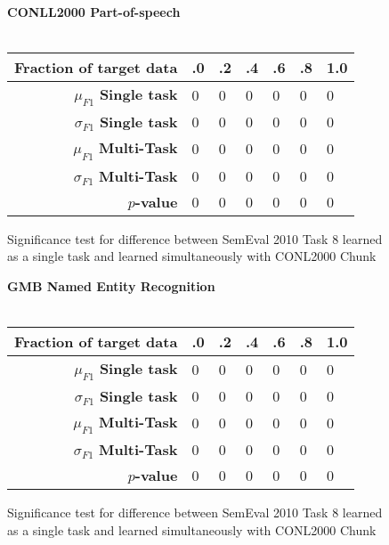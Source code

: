 \newpage
\vspace*{5.2cm}
\begin{figure}[h]
	\hspace*{-3cm}\textbf{CONLL2000 Part-of-speech}
	\\\\
	\centering
	\begin{tabular}{r | l | l | l | l | l | l}
		\textbf{Fraction of target data} & .0 & .2 & .4 & .6 & .8 & 1.0 \\  \hline
		$\mu_{F1}$ \textbf{Single task} & 0 & 0 & 0 & 0 & 0 & 0\\
		$\sigma_{F1}$ \textbf{Single task} & 0 & 0 & 0 & 0 & 0 & 0\\
		$\mu_{F1}$ \textbf{Multi-Task} & 0 & 0 & 0 & 0 & 0 & 0\\
		$\sigma_{F1}$ \textbf{Multi-Task} & 0 & 0 & 0 & 0 & 0 & 0\\
		$p$\textbf{-value} & 0 & 0 & 0 & 0 & 0 & 0
	\end{tabular}
	\caption{Significance test for difference between SemEval 2010 Task 8 learned as a single task and learned simultaneously with CONL2000 Chunk}
\end{figure}
\begin{figure}[h]
	\hspace*{-3cm}\textbf{GMB Named Entity Recognition}
	\\\\
	\centering
	\begin{tabular}{r | l | l | l | l | l | l}
		\textbf{Fraction of target data} & .0 & .2 & .4 & .6 & .8 & 1.0 \\  \hline
		$\mu_{F1}$ \textbf{Single task} & 0 & 0 & 0 & 0 & 0 & 0\\
		$\sigma_{F1}$ \textbf{Single task} & 0 & 0 & 0 & 0 & 0 & 0\\
		$\mu_{F1}$ \textbf{Multi-Task} & 0 & 0 & 0 & 0 & 0 & 0\\
		$\sigma_{F1}$ \textbf{Multi-Task} & 0 & 0 & 0 & 0 & 0 & 0\\
		$p$\textbf{-value} & 0 & 0 & 0 & 0 & 0 & 0
	\end{tabular}
	\caption{Significance test for difference between SemEval 2010 Task 8 learned as a single task and learned simultaneously with CONL2000 Chunk}
\end{figure}